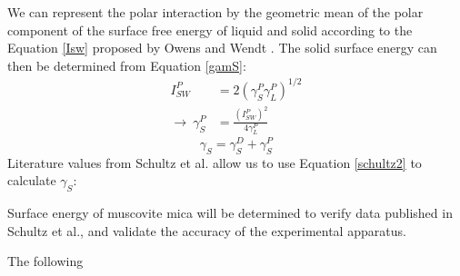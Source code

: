 We can represent the polar interaction by the geometric mean of the polar component of the surface free energy of liquid and solid according to the Equation \ref{Isw} proposed by Owens and Wendt \cite{Owens1969}. The solid surface energy can then be determined from Equation \ref{gamS}:
\begin{equation}
\label{Isw}
	\begin{split}
	I_{SW}^{P} 							& = 2 (\gamma_{S}^{P}\gamma_{L}^{P})^{1/2} \\
	\rightarrow ~ \gamma_{S}^{P}	& = \frac{(I_{SW}^{P})^{2} }{4\gamma_{L}^{P}} 
	\end{split}
\end{equation}
\begin{equation}
\label{gamS}	\gamma_{S} = \gamma_{S}^{D} + \gamma_{S}^{P}	
\end{equation}
Literature values from Schultz et al.\cite{Schultz1977} allow us to use Equation \ref{schultz2} to calculate $\gamma_{S}$:


Surface energy of muscovite mica will be determined to verify data published in Schultz et al.\cite{Schultz1977,Schultz1992}, and validate the accuracy of the experimental apparatus. 

The following 


